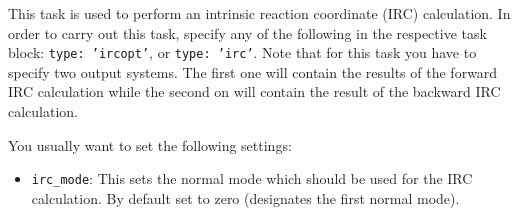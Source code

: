 \documentclass[]{tufte-book}
\begin{document}
This task is used to perform an intrinsic reaction coordinate (IRC) calculation. In 
order to carry out this task, specify any of the following in the respective task block: \texttt{type: 'ircopt'}, 
or \texttt{type: 'irc'}. Note that for this task you have to specify two output systems. The first one will contain
the results of the forward IRC calculation while the second on will contain the result of the backward IRC calculation.

You usually want to set the following settings:
\begin{itemize}
\item \texttt{irc\_mode}: This sets the normal mode which should be used for the IRC calculation. By default set to zero
(designates the first normal mode).
\end{itemize}
\end{document}
